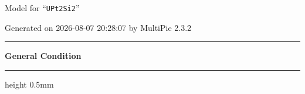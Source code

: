 \documentclass[fleqn,10pt,landscape]{jsarticle}
\begin{document}
\setcounter{MaxMatrixCols}{32}

\renewcommand{\tablename}{Table~}
\renewcommand{\figurename}{Figure~}
\setlength{\baselineskip}{16pt}
\setlength{\parindent}{0pt}
\setlength{\mathindent}{0pt}
\footnotesize
\begin{center}
\LARGE
Model for ``\texttt{UPt2Si2}''
\end{center}
\begin{flushright}
Generated on 2026-08-07 20:28:07 by MultiPie 2.3.2
\end{flushright}
\setlength{\baselineskip}{16pt}
\footnotesize
\vspace{5mm}
\noindent \rule[0.5mm]{5mm}{0.5mm}\hspace{3mm}\textbf{General Condition}\hspace{3mm}\leaders\hrule height 0.5mm\hfill\kern0pt
\vspace{3mm}
\end{document}
